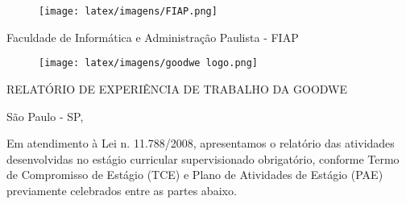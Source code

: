 \documentclass{tcc}
\begin{document}
\pagestyle{empty} %


\begin{figure}[H]
\centering
\texttt{[image: latex/imagens/FIAP.png]}
\end{figure}

\begin{center}
\Large
Faculdade de Informática e Administração Paulista - FIAP \\
\vspace{3cm}
\begin{figure}[H]
\centering

\texttt{[image: latex/imagens/goodwe logo.png]}
\end{figure}
\end{center}


\vspace{1em}

\begin{center}
\large

\end{center}

\vfill


\begin{center}
\LARGE{RELATÓRIO DE EXPERIÊNCIA DE TRABALHO DA GOODWE}
\end{center}

\vspace{2in}

\begin{center}
\large
São Paulo - SP, \the\year
\end{center}
\afterpage{\addtocounter{page}{1}} %

\newpage


\hfill
\begin{minipage}[t]{0.4\textwidth}
Em atendimento à Lei n. 11.788/2008, apresentamos o relatório das atividades desenvolvidas no estágio curricular supervisionado obrigatório, conforme Termo de Compromisso de Estágio (TCE) e Plano de Atividades de Estágio (PAE) previamente celebrados entre as partes abaixo.
\end{minipage}
\end{document}

